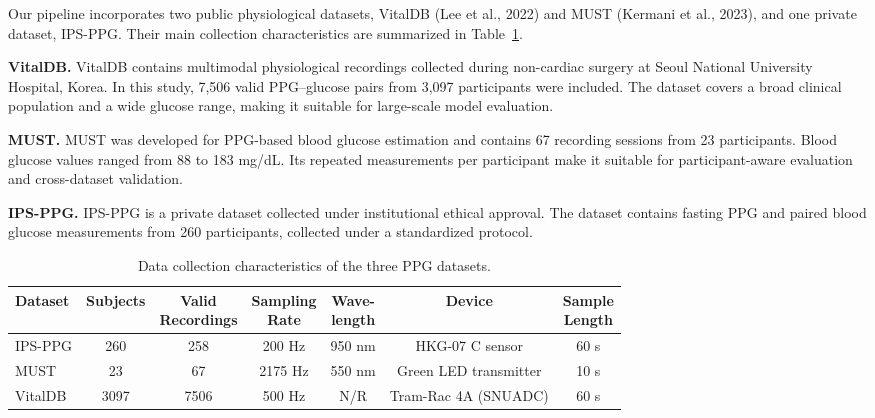 \documentclass{article}
\begin{document}
Our pipeline incorporates two public physiological datasets, VitalDB (Lee et al., 2022) and MUST (Kermani et al., 2023), and one private dataset, IPS-PPG. Their main collection characteristics are summarized in Table~\ref{tab:dataset_collection}.

\textbf{VitalDB.}
VitalDB contains multimodal physiological recordings collected during non-cardiac surgery at Seoul National University Hospital, Korea. In this study, 7,506 valid PPG--glucose pairs from 3,097 participants were included. The dataset covers a broad clinical population and a wide glucose range, making it suitable for large-scale model evaluation.

\textbf{MUST.}
MUST was developed for PPG-based blood glucose estimation and contains 67 recording sessions from 23 participants. Blood glucose values ranged from 88 to 183 mg/dL. Its repeated measurements per participant make it suitable for participant-aware evaluation and cross-dataset validation.

\textbf{IPS-PPG.}
IPS-PPG is a private dataset collected under institutional ethical approval. The dataset contains fasting PPG and paired blood glucose measurements from 260 participants, collected under a standardized protocol.

\begin{table}[H]
\centering
\caption{Data collection characteristics of the three PPG datasets.}
\label{tab:dataset_collection}
\scriptsize
\small
\setlength{\tabcolsep}{3pt}
\renewcommand{\arraystretch}{1.0}

\begin{tabular}{lcccccc}
\toprule
\textbf{Dataset} &
\textbf{Subjects} &
\makecell{\textbf{Valid}\\\textbf{Recordings}} &
\makecell{\textbf{Sampling}\\\textbf{Rate}} &
\makecell{\textbf{Wave-}\\\textbf{length}} &
\textbf{Device} &
\makecell{\textbf{Sample}\\\textbf{Length}} \\
\midrule

IPS-PPG &
260 &
258 &
200 Hz &
950 nm &
HKG-07 C sensor &
60 s \\

MUST &
23 &
67 &
2175 Hz &
550 nm &
Green LED transmitter &
10 s \\

VitalDB &
3097 &
7506 &
500 Hz &
N/R &
Tram-Rac 4A (SNUADC) &
60 s \\

\bottomrule
\end{tabular}

\end{table}
\end{document}
